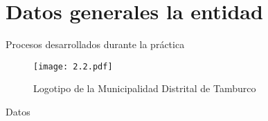 \section*{Datos generales la entidad}

\begin{frame}{Procesos desarrollados durante la práctica}
	\begin{minipage}{0.35\textwidth}
		\begin{figure}[H]
			\captionsetup{width=\textwidth}
			\centering
			\texttt{[image: 2.2.pdf]}
			\caption[Logotipo de la Municipalidad Distrital de Tamburco]{Logotipo de la Municipalidad Distrital de Tamburco}
			\label{fig:mdt-1}
		\end{figure}
	\end{minipage}
	\quad
	\begin{minipage}{0.55\textwidth}
		\begin{block}{Datos}
			\begin{table}[H]
				\centering
				\label{tab:addlabel}%
			\end{table}%
		\end{block}
	\end{minipage}
\end{frame}
